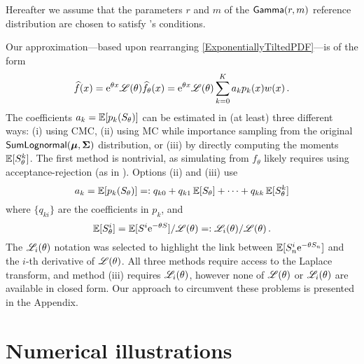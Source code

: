 

Hereafter we assume that the parameters $r$ and $m$ of the $\mathsf{Gamma}(r,m)$ reference distribution are chosen to satisfy 's conditions.

Our approximation---based upon rearranging \eqref{ExponentiallyTiltedPDF}---is of the form
\begin{equation}\label{fGammaApprox}
 \widehat{f}(x) = \mathrm{e}^{\theta x} \mathscr{L}(\theta) \widehat{f}_\theta(x) = \mathrm{e}^{\theta x} \mathscr{L}(\theta) \sum_{k=0}^K a_k p_k(x) w(x) \,.
\end{equation}
The coefficients $a_k = \operatorname{{\mathbb E}} [p_k(S_\theta)]$ can be estimated in (at least) three different ways: (i) using CMC, (ii) using MC while importance sampling from the original $\mathsf{SumLognormal}(\bm{\mu}, \bm{\Sigma})$ distribution, or (iii) by directly computing the moments $\operatorname{{\mathbb E}}[S_\theta^k]$. The first method is nontrivial, as simulating from $f_\theta$ likely requires using acceptance-rejection (as in \cite{asmussen2015exponential}). Options (ii) and (iii) use
\begin{equation} \label{eq:expand_coeffs}
	a_k = \operatorname{{\mathbb E}} [p_k(S_\theta)] =: q_{k0} + q_{k1} \operatorname{{\mathbb E}}[S_\theta] + \dots + q_{kk} \operatorname{{\mathbb E}}[S_\theta^k]
\end{equation}
where $\{q_{ki}\}$ are the coefficients in $p_k$, and
\[
\operatorname{{\mathbb E}}[S_\theta^i] = \operatorname{{\mathbb E}}[S^i \mathrm{e}^{-\theta S}] / \mathscr{L}(\theta) =: \mathscr{L}_i(\theta) / \mathscr{L}(\theta) \,.
\]
The $\mathscr{L}_i(\theta)$ notation was selected to highlight the link between $\operatorname{{\mathbb E}}[S_n^i \mathrm{e}^{-\theta S_n}]$ and the $i$-th derivative of $\mathscr{L}(\theta)$. All three methods require access to the Laplace transform, and method (iii) requires $\mathscr{L}_i(\theta)$, however none of $\mathscr{L}(\theta)$ or $\mathscr{L}_i(\theta)$ are available in closed form. Our approach to circumvent these problems is presented in the Appendix.

\section{Numerical illustrations}\label{S:numerical}

